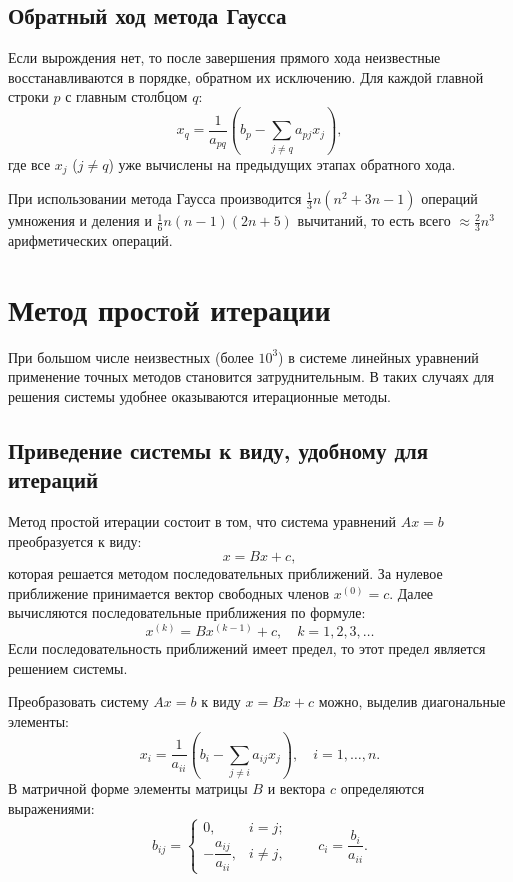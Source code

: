 \subsection{Обратный ход метода Гаусса}

Если вырождения нет, то после завершения прямого хода неизвестные восстанавливаются в порядке, обратном их исключению. Для каждой главной строки $p$ с главным столбцом $q$:
\begin{equation}
    x_q = \frac{1}{a_{pq}} \left( b_p - \sum_{j \neq q} a_{pj} x_j \right),
    \label{eq:gauss_back}
\end{equation}
где все $x_j$ ($j \neq q$) уже вычислены на предыдущих этапах обратного хода.

При использовании метода Гаусса производится $\frac{1}{3}n(n^2 + 3n - 1)$ операций умножения и деления и $\frac{1}{6}n(n - 1)(2n + 5)$ вычитаний, то есть всего $\approx \frac{2}{3}n^3$ арифметических операций.

\section{Метод простой итерации}

При большом числе неизвестных (более $10^3$) в системе линейных уравнений применение точных методов становится затруднительным. В таких случаях для решения системы удобнее оказываются итерационные методы.

\subsection{Приведение системы к виду, удобному для итераций}

Метод простой итерации состоит в том, что система уравнений $Ax = b$ преобразуется к виду:
\begin{equation}
    x = Bx + c,
    \label{eq:iter_canonical}
\end{equation}
которая решается методом последовательных приближений. За нулевое приближение принимается вектор свободных членов $x^{(0)} = c$. Далее вычисляются последовательные приближения по формуле:
\begin{equation}
    x^{(k)} = Bx^{(k-1)} + c, \quad k = 1, 2, 3, \ldots
    \label{eq:iter_formula}
\end{equation}
Если последовательность приближений имеет предел, то этот предел является решением системы.

Преобразовать систему $Ax = b$ к виду $x = Bx + c$ можно, выделив диагональные элементы:
\begin{equation}
    x_i = \frac{1}{a_{ii}} \left( b_i - \sum_{j \neq i} a_{ij} x_j \right), \quad i = 1, \ldots, n.
\end{equation}
В матричной форме элементы матрицы $B$ и вектора $c$ определяются выражениями:
\begin{equation}
    b_{ij} =
    \begin{cases}
        0, & i = j; \\
        -\dfrac{a_{ij}}{a_{ii}}, & i \neq j,
    \end{cases}
    \qquad
    c_i = \dfrac{b_i}{a_{ii}}.
    \label{eq:b_and_c}
\end{equation}

